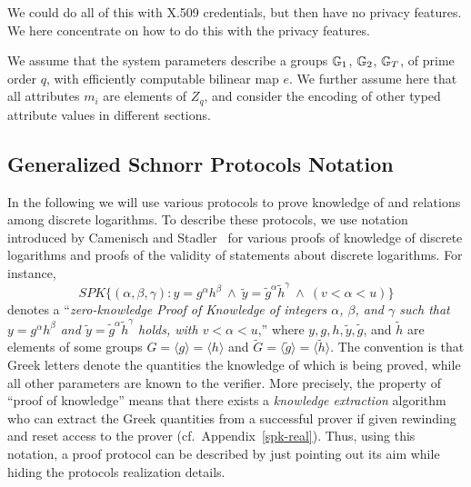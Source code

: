 
We could do all of this with X.509 credentials, but then have no privacy features. 
We here concentrate on how to do this with the privacy features.


We assume that the system parameters describe a groups $\mathbb{G}_1$, $\mathbb{G}_2$, $\mathbb{G}_T$, of prime order $q$, with efficiently computable bilinear map $e$.
We further assume here that all attributes $m_i$ are elements of $Z_q$, and consider the encoding of other typed attribute values in different sections.

\subsection{Generalized Schnorr Protocols Notation}


In the following we will use various protocols to prove knowledge of and relations 
among discrete logarithms.
To describe these protocols, we use  notation introduced by Camenisch and
Stadler~\cite{camsta97b} for various proofs of knowledge of discrete
logarithms and proofs of the validity of statements about discrete logarithms.
For instance,
\[\textit{SPK}
\{ (\alpha,\beta,\gamma): y = g^\alpha h^\beta \ \wedge \ \tilde{y} =
\tilde{g}^\alpha \tilde{h}^\gamma \ \wedge \ ( v < \alpha < u) \}
\]
denotes a ``\textit{zero-knowledge \emph{P}roof of \emph{K}nowledge of
  integers $\alpha$, $\beta$, and $\gamma$ such that $y = g^\alpha h^\beta$
  and $\tilde{y} = \tilde{g}^\alpha \tilde{h}^\gamma$ holds, with $ v <
  \alpha < u$},'' where $y,g,h,\tilde{y},\tilde{g}$, and $\tilde{h}$ are
elements of some groups $G = \langle g\rangle = \langle h\rangle$ and
$\tilde{G} = \langle \tilde{g}\rangle = \langle \tilde{h} \rangle$.  
The
convention is that Greek letters denote the quantities the knowledge of which is
being proved, while all other parameters are known to the verifier. 
More precisely, the property of ``proof of knowledge'' means that there exists a
\emph{knowledge extraction} 
algorithm who can 
extract the Greek quantities from a successful prover if given rewinding and
reset access to the prover (cf.~Appendix~\ref{spk-real}).
Thus, using this
notation, a proof protocol can be described by just pointing out its aim while
hiding the protocols realization details.



